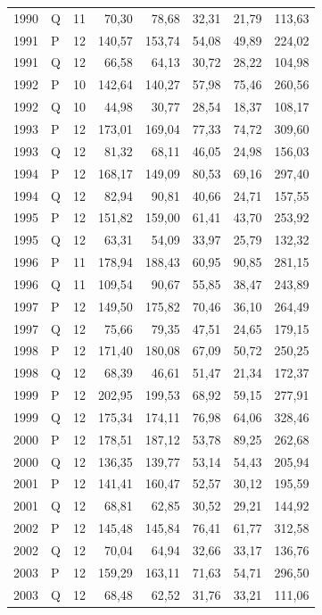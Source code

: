 \begin{longtable}{llrrrrrr}
1990 & Q & 11 & 70,30 & 78,68 & 32,31 & 21,79 & 113,63 \\
1991 & P & 12 & 140,57 & 153,74 & 54,08 & 49,89 & 224,02 \\
1991 & Q & 12 & 66,58 & 64,13 & 30,72 & 28,22 & 104,98 \\
1992 & P & 10 & 142,64 & 140,27 & 57,98 & 75,46 & 260,56 \\
1992 & Q & 10 & 44,98 & 30,77 & 28,54 & 18,37 & 108,17 \\
1993 & P & 12 & 173,01 & 169,04 & 77,33 & 74,72 & 309,60 \\
1993 & Q & 12 & 81,32 & 68,11 & 46,05 & 24,98 & 156,03 \\
1994 & P & 12 & 168,17 & 149,09 & 80,53 & 69,16 & 297,40 \\
1994 & Q & 12 & 82,94 & 90,81 & 40,66 & 24,71 & 157,55 \\
1995 & P & 12 & 151,82 & 159,00 & 61,41 & 43,70 & 253,92 \\
1995 & Q & 12 & 63,31 & 54,09 & 33,97 & 25,79 & 132,32 \\
1996 & P & 11 & 178,94 & 188,43 & 60,95 & 90,85 & 281,15 \\
1996 & Q & 11 & 109,54 & 90,67 & 55,85 & 38,47 & 243,89 \\
1997 & P & 12 & 149,50 & 175,82 & 70,46 & 36,10 & 264,49 \\
1997 & Q & 12 & 75,66 & 79,35 & 47,51 & 24,65 & 179,15 \\
1998 & P & 12 & 171,40 & 180,08 & 67,09 & 50,72 & 250,25 \\
1998 & Q & 12 & 68,39 & 46,61 & 51,47 & 21,34 & 172,37 \\
1999 & P & 12 & 202,95 & 199,53 & 68,92 & 59,15 & 277,91 \\
1999 & Q & 12 & 175,34 & 174,11 & 76,98 & 64,06 & 328,46 \\
2000 & P & 12 & 178,51 & 187,12 & 53,78 & 89,25 & 262,68 \\
2000 & Q & 12 & 136,35 & 139,77 & 53,14 & 54,43 & 205,94 \\
2001 & P & 12 & 141,41 & 160,47 & 52,57 & 30,12 & 195,59 \\
2001 & Q & 12 & 68,81 & 62,85 & 30,52 & 29,21 & 144,92 \\
2002 & P & 12 & 145,48 & 145,84 & 76,41 & 61,77 & 312,58 \\
2002 & Q & 12 & 70,04 & 64,94 & 32,66 & 33,17 & 136,76 \\
2003 & P & 12 & 159,29 & 163,11 & 71,63 & 54,71 & 296,50 \\
2003 & Q & 12 & 68,48 & 62,52 & 31,76 & 33,21 & 111,06 \\

\end{longtable}
